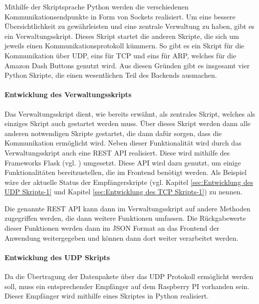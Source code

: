 Mithilfe der Skriptsprache Python werden die verschiedenen Kommunikationsendpunkte in Form von Sockets realisiert. Um eine bessere Übersichtlichkeit zu gewährleisten und eine zentrale Verwaltung zu haben, gibt es ein Verwaltungsskript. Dieses Skript startet die anderen Skripte, die sich um jeweils einen Kommunikationsprotokoll kümmern. So gibt es ein Skript für die Kommunikation über \ac{UDP}, eins für \ac{TCP} und eins für \ac{ARP}, welches für die Amazon Dash Buttons genutzt wird. Aus diesen Gründen gibt es insgesamt vier Python Skripte, die einen wesentlichen Teil des Backends ausmachen.

\paragraph{Entwicklung des Verwaltungsskripts}$\;$ \\  
\label{sec:Entwicklung des Verwaltungsskripts-1} 
Das Verwaltungsskript dient, wie bereits erwähnt, als zentrales Skript, welches als einziges Skript auch gestartet werden muss. Über dieses Skript werden dann alle anderen notwendigen Skripte gestartet, die dann dafür sorgen, dass die Kommunikation ermöglicht wird. 
Neben dieser Funktionalität wird durch das Verwaltungsskript auch eine \ac{REST} \ac{API} realisiert. Diese wird mithilfe des Frameworks Flask (vgl. \cite{.s}) umgesetzt. Diese \ac{API} wird dazu genutzt, um einige Funktionalitäten bereitzustellen, die im Frontend benötigt werden. Als Beispiel wäre der aktuelle Status der Empfängerskripte (vgl. Kapitel \ref{sec:Entwicklung des UDP Skripts-1} und Kapitel \ref{sec:Entwicklung des TCP Skripts-1}) zu nennen. 

Die genannte \ac{REST} \ac{API} kann dann im Verwaltungsskript auf andere Methoden zugegriffen werden, die dann weitere Funktionen umfassen. Die Rückgabewerte dieser Funktionen werden dann im \ac{JSON} Format an das Frontend der Anwendung weitergegeben und können dann dort weiter verarbeitet werden. 

\paragraph{Entwicklung des UDP Skripts}$\;$ \\  
\label{sec:Entwicklung des UDP Skripts-1} 
Da die Übertragung der Datenpakete über das \ac{UDP} Protokoll ermöglicht werden soll, muss ein entsprechender Empfänger auf dem Raspberry PI vorhanden sein. Dieser Empfänger wird mithilfe eines Skriptes in Python realisiert.

